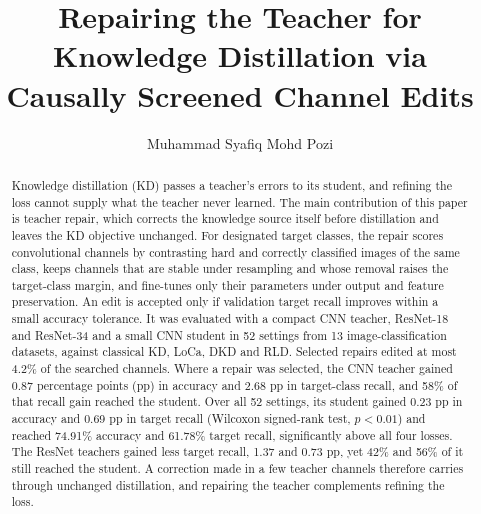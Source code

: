 \documentclass[review,number,sort&compress]{elsarticle}
\theoremstyle{definition}
\begin{document}
\begin{frontmatter}

\title{Repairing the Teacher for Knowledge Distillation via Causally Screened Channel Edits}

\author{Muhammad Syafiq Mohd Pozi}


\begin{abstract}
Knowledge distillation (KD) passes a teacher's errors to its student,
and refining the loss cannot supply what the teacher never
learned. The main contribution of this paper is teacher repair, which
corrects the knowledge source itself before distillation and leaves the
KD objective unchanged. For designated target classes, the repair scores
convolutional channels by contrasting hard and correctly classified
images of the same class, keeps channels that are stable under
resampling and whose removal raises the target-class margin, and
fine-tunes only their parameters under output and feature preservation.
An edit is accepted only if validation target recall improves within a
small accuracy tolerance. It was evaluated with a compact CNN
teacher, ResNet-18 and ResNet-34 and a small CNN student in 52 settings
from 13 image-classification datasets, against classical KD, LoCa, DKD
and RLD. Selected repairs edited at most 4.2\% of the searched
channels. Where a repair was selected, the CNN teacher gained 0.87
percentage points (pp) in accuracy and 2.68 pp in target-class recall,
and 58\% of that recall gain reached the student. Over all 52 settings,
its student gained 0.23 pp in accuracy and 0.69 pp in target recall
(Wilcoxon signed-rank test, $p<0.01$) and reached 74.91\% accuracy and
61.78\% target recall, significantly above all four losses. The ResNet
teachers gained less target recall, 1.37 and 0.73 pp, yet 42\% and 56\% of
it still reached the student. A correction made in a few teacher
channels therefore carries through unchanged distillation, and repairing
the teacher complements refining the loss.
\end{abstract}



\end{frontmatter}
\end{document}
